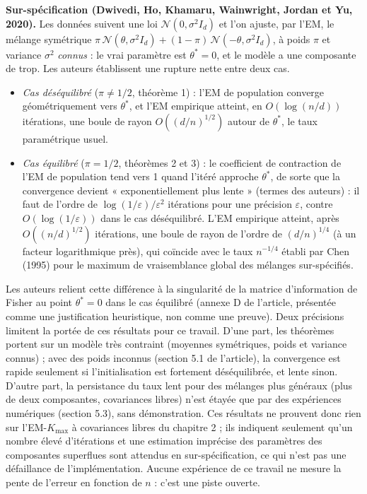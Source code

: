 \textbf{Sur-spécification (Dwivedi, Ho, Khamaru, Wainwright, Jordan et Yu, 2020).} Les données suivent une loi $\mathcal{N}(0, \sigma^2 I_d)$ et l'on ajuste, par l'EM, le mélange symétrique $\pi\,\mathcal{N}(\theta, \sigma^2 I_d) + (1-\pi)\,\mathcal{N}(-\theta, \sigma^2 I_d)$, à poids $\pi$ et variance $\sigma^2$ \emph{connus} : le vrai paramètre est $\theta^* = 0$, et le modèle a une composante de trop. Les auteurs établissent une rupture nette entre deux cas.
\begin{itemize}
\item \emph{Cas déséquilibré} ($\pi \neq 1/2$, théorème 1) : l'EM de population converge géométriquement vers $\theta^*$, et l'EM empirique atteint, en $O(\log(n/d))$ itérations, une boule de rayon $O((d/n)^{1/2})$ autour de $\theta^*$, le taux paramétrique usuel.
\item \emph{Cas équilibré} ($\pi = 1/2$, théorèmes 2 et 3) : le coefficient de contraction de l'EM de population tend vers 1 quand l'itéré approche $\theta^*$, de sorte que la convergence devient « exponentiellement plus lente » (termes des auteurs) : il faut de l'ordre de $\log(1/\varepsilon)/\varepsilon^2$ itérations pour une précision $\varepsilon$, contre $O(\log(1/\varepsilon))$ dans le cas déséquilibré. L'EM empirique atteint, après $O((n/d)^{1/2})$ itérations, une boule de rayon de l'ordre de $(d/n)^{1/4}$ (à un facteur logarithmique près), qui coïncide avec le taux $n^{-1/4}$ établi par Chen (1995) pour le maximum de vraisemblance global des mélanges sur-spécifiés.
\end{itemize}
Les auteurs relient cette différence à la singularité de la matrice d'information de Fisher au point $\theta^* = 0$ dans le cas équilibré (annexe D de l'article, présentée comme une justification heuristique, non comme une preuve). Deux précisions limitent la portée de ces résultats pour ce travail. D'une part, les théorèmes portent sur un modèle très contraint (moyennes symétriques, poids et variance connus) ; avec des poids inconnus (section 5.1 de l'article), la convergence est rapide seulement si l'initialisation est fortement déséquilibrée, et lente sinon. D'autre part, la persistance du taux lent pour des mélanges plus généraux (plus de deux composantes, covariances libres) n'est étayée que par des expériences numériques (section 5.3), sans démonstration. Ces résultats ne prouvent donc rien sur l'EM-$K_{\max}$ à covariances libres du chapitre 2 ; ils indiquent seulement qu'un nombre élevé d'itérations et une estimation imprécise des paramètres des composantes superflues sont attendus en sur-spécification, ce qui n'est pas une défaillance de l'implémentation. Aucune expérience de ce travail ne mesure la pente de l'erreur en fonction de $n$ : c'est une piste ouverte.

